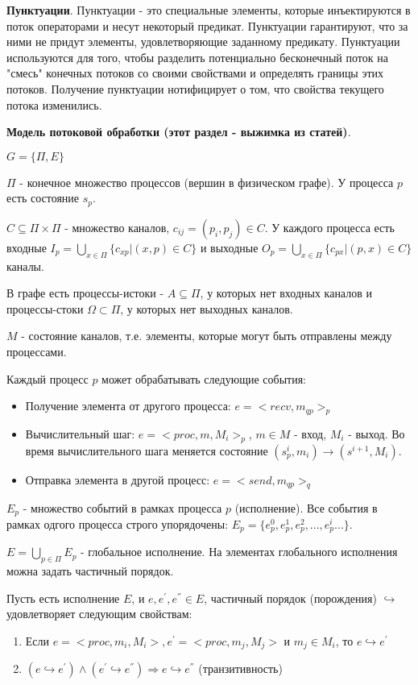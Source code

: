 \documentclass[12pt]{article}
\begin{document}
\textbf{Пунктуации}. Пунктуации - это специальные элементы, которые инъектируются в поток операторами и несут некоторый предикат. Пунктуации гарантируют, что за ними не придут элементы, удовлетворяющие заданному предикату. Пунктуации используются для того, чтобы разделить потенциально бесконечный поток на "смесь" конечных потоков со своими свойствами и определять границы этих потоков. Получение пунктуации нотифицирует о том, что свойства текущего потока изменились.

\textbf{Модель потоковой обработки (этот раздел - выжимка из статей)}.

$G = \{\Pi, E \}$

$\Pi$ - конечное множество процессов (вершин в физическом графе). У процесса $p$ есть состояние $s_p$.

$C \subseteq \Pi \times \Pi$ - множество каналов, $c_{ij} = (p_i,p_j) \in C$. У каждого процесса есть входные $I_p = \bigcup_{x \in \Pi} \{c_{xp} | (x,p) \in C\}$ и выходные $O_p = \bigcup_{x \in \Pi} \{c_{px} | (p,x) \in C\}$ каналы.

В графе есть процессы-истоки - $A \subseteq \Pi$, у которых нет входных каналов и процессы-стоки $\Omega \subset \Pi$, у которых нет выходных каналов.

$M$ - состояние каналов, т.е. элементы, которые могут быть отправлены между процессами.

Каждый процесс $p$ может обрабатывать следующие события:

\begin{itemize}
    \item Получение элемента от другого процесса: $e = <recv, m_{qp}>_p$
    \item Вычислительный шаг: $e = <proc,m,M_i>_p$, $m \in M$ - вход, $M_i$ - выход. Во время вычислительного шага меняется состояние $(s^{i}_p, m_i) \rightarrow (s^{i+1}, M_i)$.
    \item Отправка элемента в другой процесс: $e = <send, m_{qp}>_q$
\end{itemize}

$E_p$ - множество событий в рамках процесса $p$ (исполнение). Все события в рамках одгого процесса строго упорядочены: $E_p = \{e^{0}_p, e^{1}_p, e^{2}_p, ... ,e^{i}_p ... \}$.

$E = \bigcup_{p \in \Pi} E_p$ - глобальное исполнение. На элементах глобального исполнения можна задать частичный порядок.

\bigskip
{

Пусть есть исполнение $E$, и $e, e^{'}, e^{''} \in E$, частичный порядок (порождения) $\hookrightarrow$ удовлетворяет следующим свойствам:

\begin{enumerate}
    \item Если $e = <proc, m_i, M_i>, e^{'} = <proc, m_j, M_j>$ и $m_j \in M_i$, то $e \hookrightarrow e^{'}$
    \item $(e \hookrightarrow e^{'}) \land (e^{'} \hookrightarrow e^{''}) \Rightarrow e \hookrightarrow e^{''}$ (транзитивность)
\end{enumerate}
}
\end{document}
